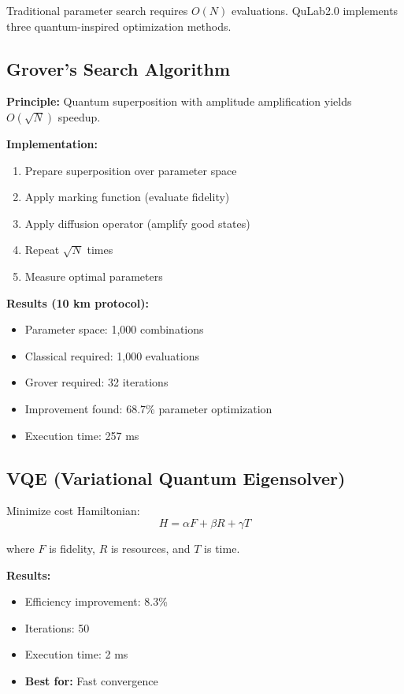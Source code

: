 \documentclass[11pt,a4paper]{article}
\begin{document}
Traditional parameter search requires $O(N)$ evaluations. QuLab2.0 implements three quantum-inspired optimization methods.

\subsection{Grover's Search Algorithm}

\textbf{Principle:} Quantum superposition with amplitude amplification yields $O(\sqrt{N})$ speedup.

\textbf{Implementation:}
\begin{enumerate}
    \item Prepare superposition over parameter space
    \item Apply marking function (evaluate fidelity)
    \item Apply diffusion operator (amplify good states)
    \item Repeat $\sqrt{N}$ times
    \item Measure optimal parameters
\end{enumerate}

\textbf{Results (10 km protocol):}
\begin{itemize}
    \item Parameter space: 1,000 combinations
    \item Classical required: 1,000 evaluations
    \item Grover required: 32 iterations
    \item Improvement found: 68.7\% parameter optimization
    \item Execution time: 257 ms
\end{itemize}

\subsection{VQE (Variational Quantum Eigensolver)}

Minimize cost Hamiltonian:
$$H = \alpha F + \beta R + \gamma T$$

where $F$ is fidelity, $R$ is resources, and $T$ is time.

\textbf{Results:}
\begin{itemize}
    \item Efficiency improvement: 8.3\%
    \item Iterations: 50
    \item Execution time: 2 ms
    \item \textbf{Best for:} Fast convergence
\end{itemize}
\end{document}
